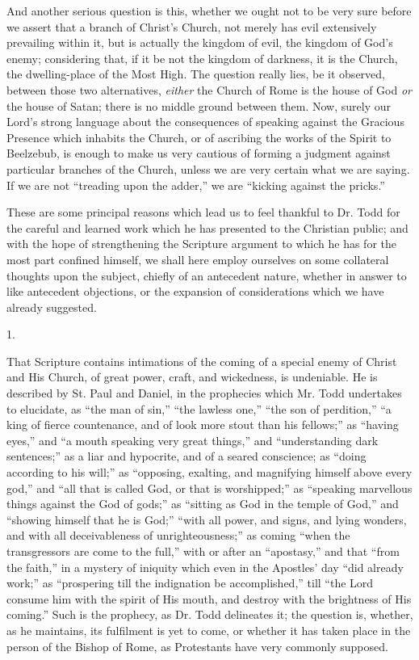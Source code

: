 And another serious question is this, whether we ought not to be
very sure before we assert that a branch of Christ's Church, not
merely has evil extensively prevailing within it, but is actually the
kingdom of evil, the kingdom of God's enemy; considering that, if it
be not the kingdom of darkness, it is the Church, the
dwelling-place of the Most High. The question really lies, be it
observed, between those two alternatives, \emph{either} the Church of
Rome is the house of God \emph{or} the house of Satan; there is no
middle ground between them. Now, surely our Lord's strong language
about the consequences of speaking against the Gracious Presence which
inhabits the Church, or of ascribing the works of the Spirit to
Beelzebub, is enough to make us very cautious of forming a judgment
against particular branches of the Church, unless we are very certain
what we are saying. If we are not ``treading upon the adder,''
we are ``kicking against the pricks.''

These are some principal reasons which lead us to feel thankful to
Dr. Todd for the careful and learned work which he has presented to
the Christian public; and with the hope of strengthening the Scripture
argument to which he has for the most part confined himself, we shall
here employ ourselves on some collateral thoughts upon the subject,
chiefly of an antecedent nature, whether in answer to like antecedent
objections, or the expansion of considerations which we have already
suggested.

1.

That Scripture contains intimations of the coming of a special
enemy of Christ and His Church, of great power, craft, and wickedness,
is undeniable. He is described by St. Paul and Daniel, in the
prophecies which Mr. Todd undertakes to elucidate, as ``the man of
sin,'' ``the lawless one,'' ``the son of
perdition,'' ``a king of fierce countenance, and of look more
stout than his fellows;'' as ``having eyes,'' and ``a
mouth speaking very great things,'' and ``understanding dark
sentences;'' as a liar and hypocrite, and of a seared conscience;
as ``doing according to his will;'' as ``opposing,
exalting, and magnifying himself above every god,'' and ``all
that is called God, or that is worshipped;'' as ``speaking
marvellous things against the God of gods;'' as ``sitting as
God in the temple of God,'' and ``showing himself that he is
God;'' ``with all power, and signs, and lying wonders, and
with all deceivableness of unrighteousness;'' as coming ``when
the transgressors are come to the full,'' with or after an
``apostasy,'' and that ``from the faith,'' in a
mystery of iniquity which even in the Apostles' day ``did already
work;'' as ``prospering till the indignation be
accomplished,'' till ``the Lord consume him with the spirit of
His mouth, and destroy with the brightness of His coming.'' Such
is the prophecy, as Dr. Todd delineates it; the question is, whether,
as he maintains, its fulfilment is yet to come, or whether it has
taken place in the person of the Bishop of Rome, as Protestants have
very commonly supposed.


